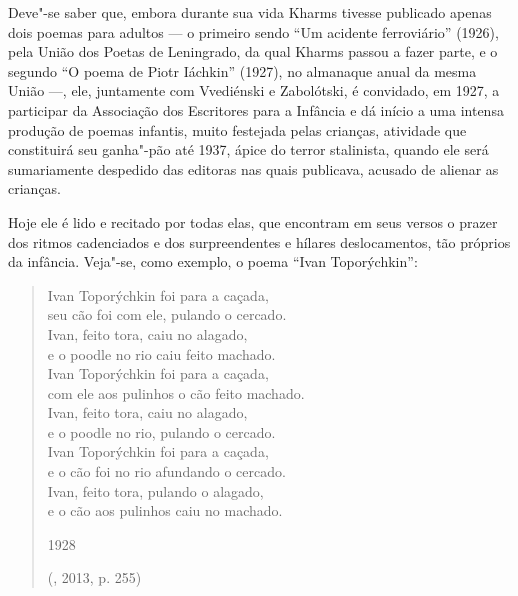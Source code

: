 Deve"-se saber que, embora durante sua vida Kharms tivesse
publicado apenas dois poemas para adultos --- o primeiro sendo
``Um acidente ferroviário'' (1926), pela União dos Poetas de
Leningrado, da qual Kharms passou a fazer parte, e o segundo
``O poema de Piotr Iáchkin'' (1927), no almanaque anual da
mesma União ---, ele, juntamente com Vvediénski e Zabolótski,
é convidado, em 1927, a participar da Associação dos Escritores
para a Infância e dá início a uma intensa produção de poemas
infantis, muito festejada pelas crianças, atividade que
constituirá seu ganha"-pão até 1937, ápice do terror stalinista,
quando ele será sumariamente despedido das editoras nas quais
publicava, acusado de alienar as crianças.

Hoje ele é lido e recitado por todas elas, que encontram em seus
versos o prazer dos ritmos cadenciados e dos surpreendentes e
hílares deslocamentos, tão próprios da infância. Veja"-se, como
exemplo, o poema ``Ivan Toporýchkin'':

\begin{verse} 
Ivan Toporýchkin foi para a caçada,\\
seu cão foi com ele, pulando o cercado.\\
Ivan, feito tora, caiu no alagado,\\
e o poodle no rio caiu feito machado.\\[8pt]
Ivan Toporýchkin foi para a caçada,\\
com ele aos pulinhos o cão feito machado.\\
Ivan, feito tora, caiu no alagado,\\
e o poodle no rio, pulando o cercado.\\[8pt]
Ivan Toporýchkin foi para a caçada,\\
e o cão foi no rio afundando o cercado.\\
Ivan, feito tora, pulando o alagado,\\
e o cão aos pulinhos caiu no machado.

1928

(, 2013, p. 255)
\end{verse}

